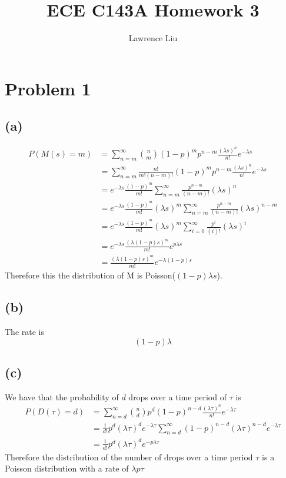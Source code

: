 \documentclass[12pt]{article}
\title{ECE C143A Homework 3}
\author{Lawrence Liu}
\begin{document}
\maketitle
\section*{Problem 1}
\subsection*{(a)}
\begin{align*}
    P(M(s)=m)&=\sum_{n=m}^{\infty}\binom{n}{m}(1-p)^mp^{n-m}\frac{(\lambda s)^n}{n!}e^{-\lambda s}\\
            &=\sum_{n=m}^{\infty}\frac{n!}{m!(n-m)!}(1-p)^mp^{n-m}\frac{(\lambda s)^n}{n!}e^{-\lambda s}\\
            &=e^{-\lambda s}\frac{(1-p)^m}{m!}\sum_{n=m}^{\infty}\frac{p^{n-m}}{(n-m)!}(\lambda s)^n\\
            &=e^{-\lambda s}\frac{(1-p)^m}{m!}(\lambda s)^{m}\sum_{n=m}^{\infty}\frac{p^{n-m}}{(n-m)!}(\lambda s)^{n-m}\\
            &=e^{-\lambda s}\frac{(1-p)^m}{m!}(\lambda s)^{m}\sum_{i=0}^{\infty}\frac{p^{i}}{(i)!}(\lambda s)^{i}\\
            &=e^{-\lambda s}\frac{(\lambda(1-p)s)^m}{m!}e^{p\lambda s}\\
            &=\frac{(\lambda(1-p)s)^m}{m!}e^{-\lambda(1-p)s}
\end{align*}
Therefore this the distribution of M is Poisson($(1-p)\lambda s$).
\subsection*{(b)}
The rate is 
$$(1-p)\lambda$$
\subsection*{(c)}
We have that the probability of $d$ drops over a time period of $\tau$ is 
\begin{align*}
    P(D(\tau)=d)&=\sum_{n=d}^{\infty}\binom{n}{d}p^d(1-p)^{n-d}\frac{(\lambda\tau)^n}{n!}e^{-\lambda \tau}\\
    &=\frac{1}{d!}p^d(\lambda\tau)^de^{-\lambda \tau}\sum_{n=d}^{\infty}(1-p)^{n-d}(\lambda\tau)^{n-d}e^{-\lambda\tau}\\
    &=\frac{1}{d!}p^d(\lambda\tau)^de^{-p\lambda\tau}
\end{align*}
Therefore the distribution of the number of drops over a time period $\tau$ is a Poisson distribution with a rate of $\lambda p \tau$




\end{document}

